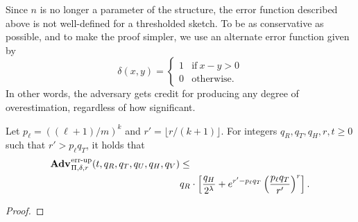 Since $n$ is no longer a parameter of the structure, the error function
described above is not well-defined for a thresholded sketch. To be as
conservative as possible, and to make the proof simpler, we use an alternate
error function given by
\begin{equation}
  \delta(x, y) =
  \begin{cases}
    1 & \text{if}\ x - y > 0 \\
    0 & \text{otherwise.}
  \end{cases}
\end{equation}
In other words, the adversary gets credit for producing any degree of
overestimation, regardless of how significant.

\begin{theorem}\label{thm:scms-erreps-th}
Let $p_\ell = ((\ell+1)/m)^k$ and $r' = \lfloor r/(k+1) \rfloor$. For integers $q_R, q_T, q_H, r, t \geq 0$ such
that $r' > p_\ell q_T$, it holds that
  \begin{equation*}
  \begin{aligned}
    \Adv{\errep}_{\Pi,\delta,r}(t, q_R,q_T,q_U,q_H,q_V) &\leq \\
     & q_R \cdot \left[\frac{q_H}{2^\lambda} + e^{r'-p_\ell q_T}\left(\frac{p_\ell q_T}{r'}\right)^r\right].
  \end{aligned}
\end{equation*}
\end{theorem}

\begin{proof}
  
\end{proof}
